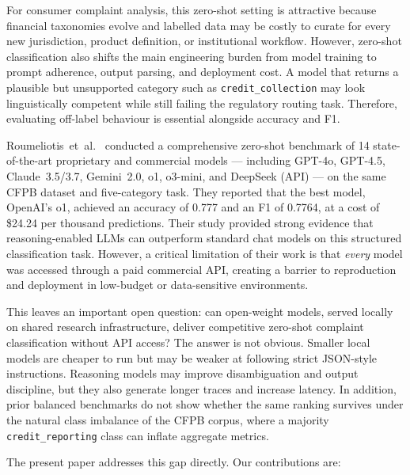 \documentclass[journal]{IEEEtran}
\begin{document}
For consumer complaint analysis, this zero-shot setting is attractive
because financial taxonomies evolve and labelled data may be costly to
curate for every new jurisdiction, product definition, or institutional
workflow. However, zero-shot classification also shifts the main
engineering burden from model training to prompt adherence, output
parsing, and deployment cost. A model that returns a plausible but
unsupported category such as \texttt{credit\_collection} may look
linguistically competent while still failing the regulatory routing
task. Therefore, evaluating off-label behaviour is essential alongside
accuracy and F1.

Roumeliotis~et~al.\ \cite{roumeliotis2025think} conducted a
comprehensive zero-shot benchmark of 14 state-of-the-art proprietary
and commercial models — including GPT-4o, GPT-4.5, Claude~3.5/3.7,
Gemini~2.0, o1, o3-mini, and DeepSeek (API) — on the same CFPB
dataset and five-category task. They reported that the best model,
OpenAI's o1, achieved an accuracy of 0.777 and an F1 of 0.7764, at a
cost of \$24.24 per thousand predictions. Their study provided strong
evidence that reasoning-enabled LLMs can outperform standard chat
models on this structured classification task. However, a critical
limitation of their work is that \emph{every} model was accessed
through a paid commercial API, creating a barrier to reproduction
and deployment in low-budget or data-sensitive environments.

This leaves an important open question: can open-weight models, served
locally on shared research infrastructure, deliver competitive
zero-shot complaint classification without API access? The answer is
not obvious. Smaller local models are cheaper to run but may be weaker
at following strict JSON-style instructions. Reasoning models may
improve disambiguation and output discipline, but they also generate
longer traces and increase latency. In addition, prior balanced
benchmarks do not show whether the same ranking survives under the
natural class imbalance of the CFPB corpus, where a majority
\texttt{credit\_reporting} class can inflate aggregate metrics.

The present paper addresses this gap directly. Our contributions are:
\end{document}
